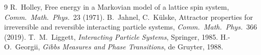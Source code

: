 \documentclass[11pt]{article}
\begin{document}
\begin{thebibliography}{9}\small
{} R.~Holley, Free energy in a Markovian model of a lattice spin system, \emph{Comm.\ Math.\ Phys.}\ 23 (1971).
 B.~Jahnel, C.~K\"ulske, Attractor properties for irreversible and reversible interacting particle systems, \emph{Comm.\ Math.\ Phys.}\ 366 (2019).
 T.~M.~Liggett, \emph{Interacting Particle Systems}, Springer, 1985.
 H.-O.~Georgii, \emph{Gibbs Measures and Phase Transitions}, de Gruyter, 1988.
\end{thebibliography}
\end{document}
